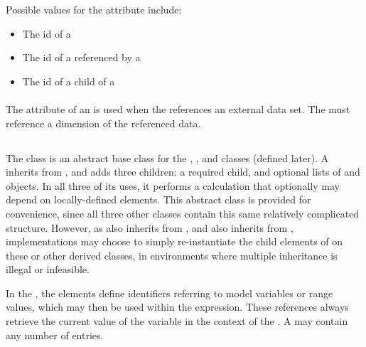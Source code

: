 Possible values for the  attribute include:
\begin{itemize}
        \item The id of a \RepeatedTask
        \item The id of a \Task referenced by a \RepeatedTask
        \item The id of a \SubTask child of a \RepeatedTask
\end{itemize}

\paragraph*{}
The  attribute of an \AppliedDimension is used when the \Variable references an external data set.  The  must reference a dimension of the referenced data.


\subsection{}
\label{class:calculation}
\label{class:listOfVariables}
\label{class:listOfParameters}

The \Calculation class is an abstract base class for the \ComputeChange, \DataGenerator, and \FunctionalRange classes (defined later).  A \Calculation inherits from \SedBase, and adds three children:  a required \Math child, and optional lists of \Variable and \Parameter objects.  In all three of its uses, it performs a calculation that optionally may depend on locally-defined elements.  This abstract class is provided for convenience, since all three other classes contain this same relatively complicated structure.  However, as \FunctionalRange also inherits from \Range, and \ComputeChange also inherits from \Change, implementations may choose to simply re-instantiate the child elements of \Calculation on these or other derived classes, in environments where multiple inheritance is illegal or infeasible.


In the \ListOfVariables, the \Variable elements define identifiers referring to model variables or range values, which may then be used within the \Math expression. These references always retrieve the current value of the variable in the context of the \Calculation.  A \ListOfVariables may contain any number of \Variable entries.

